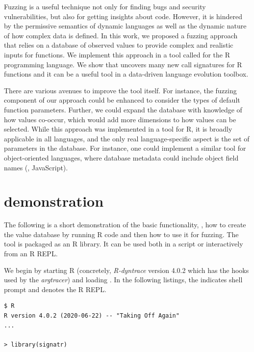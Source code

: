 \documentclass[sigplan,screen]{acmart}
\begin{document}
Fuzzing is a useful technique not only for finding bugs and security vulnerabilities, but also for getting insights about code.
However, it is hindered by the permissive semantics of dynamic languages as well as the dynamic nature of how complex data is defined.
In this work, we proposed a fuzzing approach that relies on a database of observed values to provide complex and realistic inputs for functions.
We implement this approach in a tool called \tool for the R programming language.
We show that \tool uncovers many new call signatures for R functions and it can be a useful tool in a data-driven language evolution toolbox.

There are various avenues to improve the tool itself.
For instance, the fuzzing component of our approach could be enhanced to consider the types of default function parameters.
Further, we could expand the database with knowledge of how values co-occur, which would add more dimensions to how values can be selected.
While this approach was implemented in a tool for R, it is broadly applicable in all languages, and the only real language-specific aspect is the set of parameters in the database.
For instance, one could implement a similar tool for object-oriented languages, where database metadata could include object field names (\Eg, JavaScript).




\appendix

\section{\tool demonstration}\label{sec:demo}

\lstset{
    basicstyle=\scriptsize\ttfamily,
    numbers=none,
}

The following is a short demonstration of the basic \tool functionality, \Ie, how to create the value database by running R code and then how to use it for fuzzing.
The tool is packaged as an R library.
It can be used both in a script or interactively from an R REPL.

We begin by starting R (concretely, \emph{R-dyntrace} version 4.0.2 which has the hooks used by the \emph{argtracer}) and loading \tool.
In the following listings, the \code{\$} indicates shell prompt and \code{>} denotes the R REPL.

\begin{lstlisting}
$ R
R version 4.0.2 (2020-06-22) -- "Taking Off Again"
...

> library(signatr)
\end{lstlisting}
\end{document}
